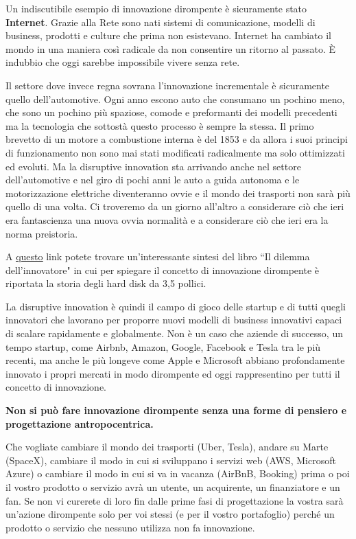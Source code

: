 Un indiscutibile esempio di innovazione dirompente è sicuramente stato \textbf{Internet}. Grazie alla Rete sono nati sistemi di comunicazione,
modelli di business, prodotti e culture che prima non esistevano. Internet ha cambiato il mondo in una maniera così radicale da non consentire un
ritorno al passato. \`E indubbio che oggi sarebbe impossibile vivere senza rete.

Il settore dove invece regna sovrana l'innovazione incrementale è sicuramente quello dell'automotive. Ogni anno escono auto che consumano un pochino
meno, che sono un pochino più spaziose, comode e preformanti dei modelli precedenti ma la tecnologia che sottostà questo processo è sempre la stessa.
Il primo brevetto di un motore a combustione interna è del 1853 e da allora i suoi principi di funzionamento non sono mai stati modificati radicalmente
ma solo ottimizzati ed evoluti. Ma la disruptive innovation sta arrivando anche nel settore dell'automotive e nel giro di pochi anni le auto a guida
autonoma e le motorizzazione elettriche diventeranno ovvie e il mondo dei trasporti non sarà più quello di una volta. Ci troveremo da un giorno
all'altro a considerare ciò che ieri era fantascienza una nuova ovvia normalità e a considerare ciò che ieri era la norma preistoria.

A \href{http://www.concept.by/approfondimenti/innovazione-radicale}{\underline{questo}} link potete trovare un'interessante sintesi del libro
``Il dilemma dell'innovatore" in cui per spiegare il concetto di innovazione dirompente è riportata la storia degli hard disk da 3,5 pollici.

La disruptive innovation è quindi il campo di gioco delle startup e di tutti quegli innovatori che lavorano per proporre nuovi modelli di business
innovativi capaci di scalare rapidamente e globalmente. Non è un caso che aziende di successo, un tempo startup, come Airbnb, Amazon, Google, Facebook
e Tesla tra le più recenti, ma anche le più longeve come Apple e Microsoft abbiano profondamente innovato i propri mercati in modo dirompente ed
oggi rappresentino per tutti il concetto di innovazione.

\vspace{\baselineskip}
\textbf{Non si può fare innovazione dirompente senza una forme di pensiero e progettazione antropocentrica.}
\vspace{\baselineskip}

Che vogliate cambiare il mondo dei trasporti (Uber, Tesla), andare su Marte (SpaceX), cambiare il modo in cui si sviluppano i servizi web (AWS,
Microsoft Azure) o cambiare il modo in cui si va in vacanza (AirBnB, Booking) prima o poi il vostro prodotto o servizio avrà un utente, un
acquirente, un finanziatore e un fan. Se non vi curerete di loro fin dalle prime fasi di progettazione la vostra sarà un'azione dirompente solo
per voi stessi (e per il vostro portafoglio) perché un prodotto o servizio che nessuno utilizza non fa innovazione.

